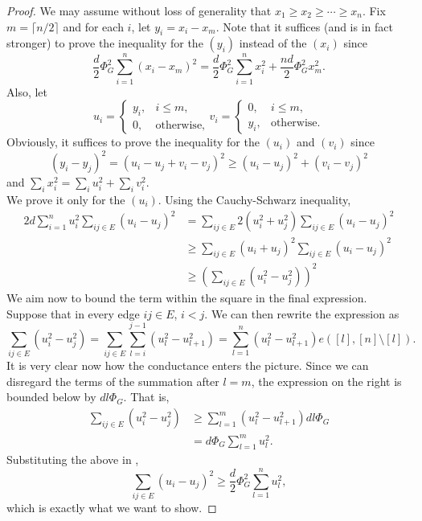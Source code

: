\begin{proof}
We may assume without loss of generality that $x_1\geq x_2\geq \cdots\geq x_n$. Fix $m=\lceil n/2\rceil$ and for each $i$, let $y_i = x_i-x_m$. Note that it suffices (and is in fact stronger) to prove the inequality for the $(y_i)$ instead of the $(x_i)$ since
\[ \frac{d}{2}\Phi_G^2\sum_{i=1}^n (x_i-x_m)^2 = \frac{d}{2}\Phi_G^2\sum_{i=1}^n x_i^2 + \frac{nd}{2}\Phi_G^2 x_m^2. \]
Also, let
\[
u_i =
\begin{cases}
y_i, & i\leq m, \\
0, & \text{otherwise},
\end{cases}
v_i =
\begin{cases}
0, & i\leq m, \\
y_i, & \text{otherwise}.
\end{cases}
\]
Obviously, it suffices to prove the inequality for the $(u_i)$ and $(v_i)$ since \[(y_i-y_j)^2 = (u_i-u_j + v_i-v_j)^2\geq (u_i-u_j)^2 + (v_i-v_j)^2\]
and $\sum_i x_i^2 = \sum_i u_i^2 + \sum_i v_i^2$.\\
We prove it only for the $(u_i)$. Using the Cauchy-Schwarz inequality,
\begin{align}
    2d\sum_{i=1}^n u_i^2 \sum_{ij\in E} (u_i-u_j)^2 &= \sum_{ij\in E} 2(u_i^2 + u_j^2) \sum_{ij\in E}(u_i-u_j)^2 \nonumber \\
    &\geq \sum_{ij\in E} (u_i + u_j)^2 \sum_{ij\in E}(u_i-u_j)^2 \nonumber \\
    &\geq \left(\sum_{ij\in E} (u_i^2 - u_j^2)\right)^2 \label{eqn: random walk speed of convergence conductance lemma 2 cauchy schwarz}
\end{align}
We aim now to bound the term within the square in the final expression.\\
Suppose that in every edge $ij\in E$, $i<j$. We can then rewrite the expression as
\[ \sum_{ij\in E} (u_i^2-u_j^2) = \sum_{ij\in E} \sum_{l=i}^{j-1} (u_l^2-u_{l+1}^2) = \sum_{l=1}^{n} (u_l^2 - u_{l+1}^2) e\left([l],[n]\setminus[l]\right). \]
It is very clear now how the conductance enters the picture. Since we can disregard the terms of the summation after $l=m$, the expression on the right is bounded below by $dl\Phi_G$. That is,
\begin{align*}
    \sum_{ij\in E} (u_i^2-u_j^2) &\geq \sum_{l=1}^m (u_l^2-u_{l+1}^2) dl\Phi_G \\
    &= d\Phi_G\sum_{l=1}^m u_l^2.
\end{align*}
Substituting the above in ,
\[ \sum_{ij\in E}(u_i-u_j)^2 \geq \frac{d}{2}\Phi_G^2 \sum_{l=1}^n u_l^2, \]
which is exactly what we want to show.
\end{proof}

